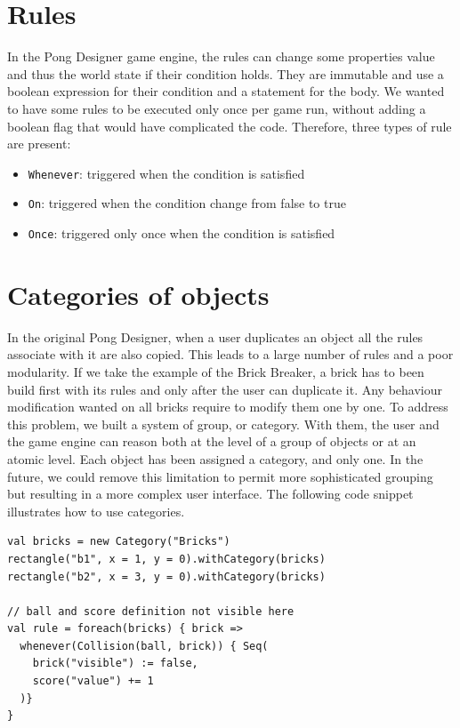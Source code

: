 \documentclass[11pt,a4paper]{article}
\begin{document}
\section{Rules}
In the Pong Designer game engine, the rules can change some properties value and thus the world state if their condition holds. They are immutable and use a boolean expression for their condition and a statement for the body. We wanted to have some rules to be executed only once per game run, without adding a boolean flag that would have complicated the code. Therefore, three types of rule are present:
\begin{itemize}[noitemsep,topsep=2pt,parsep=1pt,partopsep=1pt]
\item \texttt{Whenever}: triggered when the condition is satisfied
\item \texttt{On}: triggered when the condition change from false to true
\item \texttt{Once}: triggered only once when the condition is satisfied
\end{itemize}

\section{Categories of objects}
In the original Pong Designer, when a user duplicates an object all the rules associate with it are also copied. This leads to a large number of rules and a poor modularity. If we take the example of the Brick Breaker, a brick has to been build first with its rules and only after the user can duplicate it. Any behaviour modification wanted on all bricks require to modify them one by one. To address this problem, we built a system of group, or category. With them, the user and the game engine can reason both at the level of a group of objects or at an atomic level. Each object has been assigned a category, and only one. In the future, we could remove this limitation to permit more sophisticated grouping but resulting in a more complex user interface. The following code snippet illustrates how to use categories. 

\begin{lstlisting}
val bricks = new Category("Bricks")
rectangle("b1", x = 1, y = 0).withCategory(bricks)
rectangle("b2", x = 3, y = 0).withCategory(bricks)

// ball and score definition not visible here
val rule = foreach(bricks) { brick =>
  whenever(Collision(ball, brick)) { Seq(
    brick("visible") := false, 
    score("value") += 1
  )}
}
\end{lstlisting}
\end{document}
